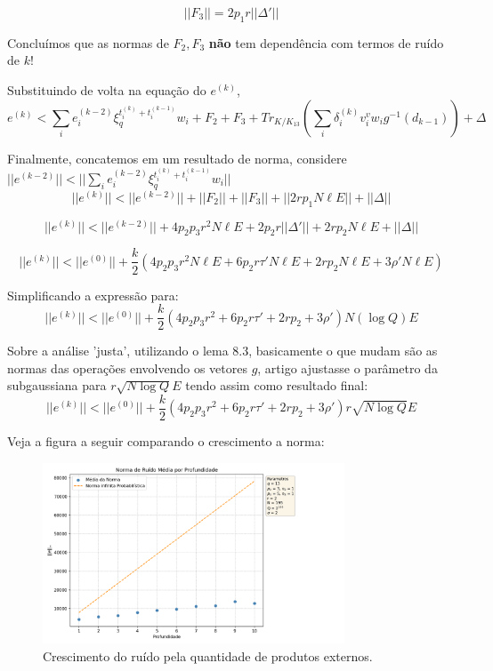 $$
||F_3|| = 2p_1r ||\Delta'||
$$

Concluímos que as normas de $F_2, F_3$ \textbf{não} tem dependência com termos de ruído de $k$!

Substituindo de volta na equação do $e^{(k)}$,
$$
e^{(k)} < \sum_i e_i^{(k-2)} \xi_q^{t^{(k)}_i + t^{(k-1)}_i} w_i + F_2 + F_3 + Tr_{K / K_{13}}(\sum_i \delta_i^{(k)} v_i^v w_i g^{-1}(d_{k-1})) +  \Delta
$$

Finalmente, concatemos em um resultado de norma, considere $||e^{(k-2)}|| <  ||\sum_i e_i^{(k-2)} \xi_q^{t^{(k)}_i + t^{(k-1)}_i} w_i||$
$$
||e^{(k)}|| < ||e^{(k-2)}||+ ||F_2|| + ||F_3|| + ||2r p_1 N \ell E || + ||\Delta||  
$$

$$
||e^{(k)}|| < ||e^{(k-2)}||+ 4 p_2p_3r^2 N \ell E + 2p_2r ||\Delta'|| + 2r p_2 N \ell E + ||\Delta||  
$$

$$
||e^{(k)}|| < ||e^{(0)}||+ \frac{k}{2}(4 p_2p_3r^2 N \ell E + 6 p_2r \tau'N\ell E  + 2r p_2 N \ell E + 3 \rho' N\ell E)
$$

Simplificando a expressão para:
$$
||e^{(k)}|| < ||e^{(0)}||+ \frac{k}{2}(4 p_2p_3r^2 + 6 p_2r \tau' + 2r p_2 + 3 \rho' ) N (\log Q) E
$$

Sobre a análise 'justa', utilizando o lema 8.3, basicamente o que mudam são as normas das operações envolvendo 
os vetores $g$, artigo ajustasse o parâmetro da subgaussiana para $r \sqrt{N \log Q} E$ tendo assim como resultado final:  
$$
||e^{(k)}|| < ||e^{(0)}||+ \frac{k}{2}(4 p_2p_3r^2 + 6 p_2r \tau' + 2r p_2 + 3 \rho' ) r \sqrt{N \log Q} E
$$

Veja a figura a seguir comparando o crescimento a norma:

\begin{figure}[htbp]
    \centering
    \includegraphics[width=0.8\textwidth]{images/norm.png}
    \caption{Crescimento do ruído pela quantidade de produtos externos.}
    \label{fig:norm}
\end{figure}

